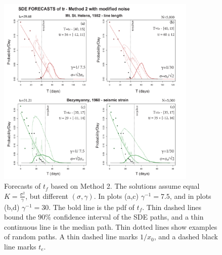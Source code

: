 \documentclass{article}
\begin{document}
\begin{figure}[H]
\centering
\includegraphics[width=0.85\textwidth]{Fig12_plus.png}
\caption{Forecasts of $t_f$ based on Method 2. The solutions assume equal $K=\frac{\sigma^2}{\gamma}$, but different $(\sigma, \gamma)$. In plots (a,c) $\gamma^{-1}=7.5$, and in plots (b,d) $\gamma^{-1}=30$. The bold line is the pdf of $t_f$. Thin dashed lines bound the $90\%$ confidence interval of the SDE paths, and a thin continuous line is the median path. Thin dotted lines show examples of random paths. A thin dashed line marks $1/x_0$, and a dashed black line marks $t_e$.}
\label{Fig12}
\end{figure}


\end{document}
